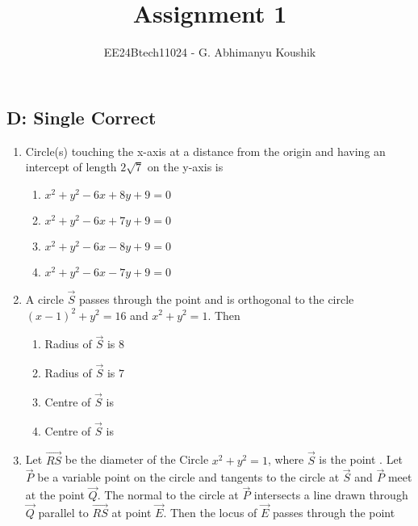 \documentclass[journal,12pt,twocolumn]{IEEEtran}
\theoremstyle{remark}
\begin{document}
\title{Assignment 1}
\author{EE24Btech11024 - G. Abhimanyu Koushik}
\maketitle
\renewcommand{\thefigure}{\theenumi}
\renewcommand{\thetable}{\theenumi}
\subsection*{D: Single Correct}
\begin{enumerate}
\item Circle(s) touching the x-axis at a distance  from the origin and having an intercept of length $2\sqrt{7}$ on the y-axis is 

\hfill{}
\begin{enumerate}
\item $x^2 + y^2 - 6x + 8y + 9 = 0$
\item $x^2 + y^2 - 6x + 7y + 9 = 0$
\item $x^2 + y^2 - 6x - 8y + 9 = 0$
\item $x^2 + y^2 - 6x - 7y + 9 = 0$
\end{enumerate}
\item A circle $\vec{S}$ passes through the point  and is orthogonal to the circle $(x-1)^2+y^2=16$ and $x^2+y^2=1$. Then

\hfill {}
\begin{enumerate}
\item Radius of $\vec{S}$ is $8$
\item Radius of $\vec{S}$ is $7$
\item Centre of $\vec{S}$ is 
\item Centre of $\vec{S}$ is 
\end{enumerate}
\item Let $\vec{RS}$ be the diameter of the Circle $x^{2} + y^{2} = 1$, where $\vec{S}$ is the point . Let $\vec{P}$ be a variable point  on the circle and tangents to the circle at $\vec{S}$ and $\vec{P}$ meet at the point $\vec{Q}$. The normal to the circle at $\vec{P}$ intersects a line drawn through $\vec{Q}$ parallel to $\vec{RS}$ at point $\vec{E}$. Then the locus of $\vec{E}$ passes through the point


\end{enumerate}
\end{document}
